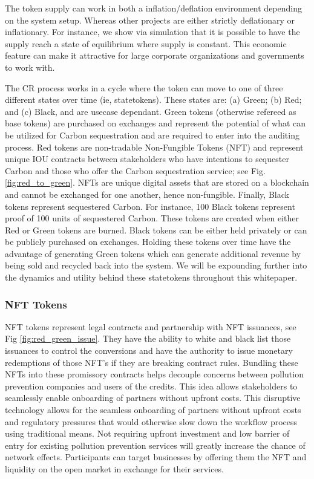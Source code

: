 \documentclass{article}
\begin{document}
The token supply can work in both a inflation/deflation environment depending on the system setup. Whereas other projects are either strictly deflationary or inflationary. For instance, we show via simulation that it is possible to have the supply reach a state of equilibrium where supply is constant.  This economic feature can make it attractive for large corporate organizations and governments to work with.

The CR process works in a cycle where the token can move to one of three different states over time (ie, statetokens). These states are: (a) Green; (b) Red; and (c) Black, and are usecase dependant. Green tokens (otherwise refereed as base tokens) are purchased on exchanges and represent the potential of what can be utilized for Carbon sequestration and are required to enter into the auditing process. Red tokens are non-tradable Non-Fungible Tokens (NFT) and represent unique IOU contracts between stakeholders who have intentions to sequester Carbon and those who offer the Carbon sequestration service; see Fig. \ref{fig:red_to_green}. NFTs are unique digital assets that are stored on a blockchain and cannot be exchanged for one another, hence non-fungible. Finally, Black tokens represent sequestered Carbon. For instance, 100 Black tokens represent proof of 100 units of sequestered Carbon. These tokens are created when either Red or Green tokens are burned. Black tokens can be either held privately or can be publicly purchased on exchanges. Holding these tokens over time have the advantage of generating Green tokens which can generate additional revenue by being sold and recycled back into the system. We will be expounding further into the dynamics and utility behind these statetokens throughout this whitepaper.
 
\subsubsection{NFT Tokens}
\label{section:nft_tokens}

NFT tokens represent legal contracts and partnership with NFT issuances, see Fig \ref{fig:red_green_issue}. They have the ability to white and black list those issuances to control the conversions and have the authority to issue monetary redemptions of those NFT’s if they are breaking contract rules. Bundling these NFTs into these promissory contracts helps decouple concerns between pollution prevention companies and users of the credits. This idea allows stakeholders to seamlessly enable onboarding of partners without upfront costs. This disruptive technology allows for the seamless onboarding of partners without upfront costs and regulatory pressures that would otherwise slow down the workflow process using traditional means. Not requiring upfront investment and low barrier of entry for existing pollution prevention services will greatly increase the chance of network effects. Participants can target businesses by offering them the NFT and liquidity on the open market in exchange for their services. 
\end{document}

